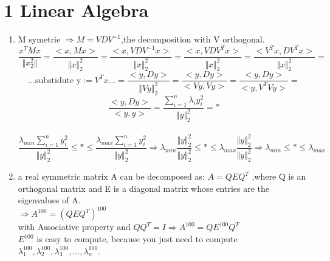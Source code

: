 \documentclass[12pt]{article}
\begin{document}

\section*{1 Linear Algebra}
\begin{enumerate}[1)]
    \item
        M symetrie $\Rightarrow M=VDV^{-1}$,the decomposition with V orthogonal.\\
        $$\frac{x^TMx}{\Vert x_2^2\Vert}=\frac{<x,Mx>}{\Vert x\Vert_2^2}=\frac{<x,VDV^{-1}x>}{\Vert x\Vert_2^2}=\frac{<x,VDV^Tx>}{\Vert x\Vert_2^2}=\frac{<V^Tx,DV^Tx>}{\Vert x\Vert_2^2}=$$$$\ldots \text{substidute y}:=V^Tx\ldots=\frac{<y,Dy>}{\Vert Vy\Vert_2^2}=\frac{<y,Dy>}{<Vy,Vy>}=\frac{<y,Dy>}{<y,V^TVy>}=$$$$\frac{<y,Dy>}{<y,y>}=\frac{\sum_{i=1}^{n}\lambda_iy_i^2}{\Vert y\Vert_2^2}=*$$\\$$\frac{\lambda_{min}\sum_{i=1}^{n}y_i^2}{\Vert y\Vert_2^2}\leq * \leq \frac{\lambda_{max}\sum_{i=1}^{n}y_i^2}{\Vert y\Vert_2^2}\Rightarrow \lambda_{min}\frac{\Vert y \Vert_2^2}{\Vert y\Vert_2^2}\leq * \leq \lambda_{max}\frac{\Vert y \Vert_2^2}{\Vert y\Vert_2^2} \Rightarrow \lambda_{min} \leq * \leq \lambda_{max}$$
    \item
        a real symmetric matrix A can be decomposed as: $A=QEQ^T$ ,where Q is an orthogonal matrix and E is a diagonal matrix whose entries are the eigenvalues of A.\\
    $\Rightarrow A^{100}=(QEQ^T)^{100}$\\
    with Associative property and $QQ^T = I \Rightarrow A^{100}=QE^{100}Q^{T}$\\
    $E^{100}$ is easy to compute, because you just need to compute $\lambda_1^{100},\lambda_2^{100},\lambda_3^{100},\ldots,\lambda_n^{100}$.\\


\end{enumerate}
\end{document}
